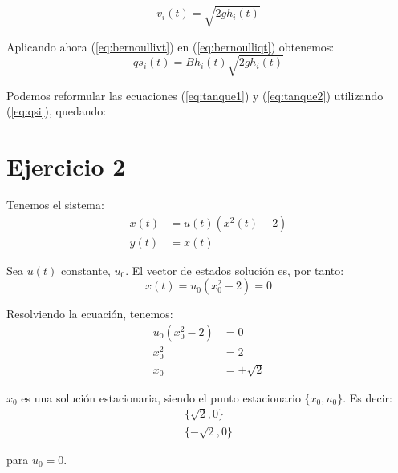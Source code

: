 \documentclass[12pt]{article}
\begin{document}
\begin{equation}
    \label{eq:bernoullivt}
    {v_i(t) = \sqrt{2 g h_i(t)}}
\end{equation}

Aplicando ahora (\ref{eq:bernoullivt}) en (\ref{eq:bernoulliqt}) obtenemos:
\begin{equation}
    \label{eq:qsi}
    {qs_i(t) = B h_i(t) \sqrt{2 g h_i(t)}}
\end{equation}

Podemos reformular las ecuaciones (\ref{eq:tanque1}) y (\ref{eq:tanque2}) utilizando (\ref{eq:qsi}), quedando:
\begin{equation}
    {}
\end{equation}

\newpage

\section{Ejercicio 2}
Tenemos el sistema:
\begin{align*}
x(t) &= u(t) (x^2(t) - 2) \\
y(t) &= x(t)
\end{align*}

Sea $u(t)$ constante, $u_0$. El vector de estados solución es, por tanto:
\begin{equation*}
    x(t) = u_0 (x_0^2 - 2) = 0
\end{equation*}

Resolviendo la ecuación, tenemos:
\begin{align*}
    u_0 (x_0^2 - 2) &= 0\\
    x_0^2 &= 2\\
    x_0 &= \pm \sqrt{2}
\end{align*}

$x_0$ es una solución estacionaria, siendo el punto estacionario $\{x_0, u_0\}$. Es decir:
\begin{align*}
    \{\sqrt{2}, 0\}\\
    \{-\sqrt{2}, 0\}
\end{align*}

para $u_0 = 0$.
\newpage
\end{document}
